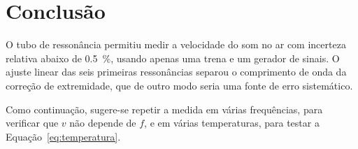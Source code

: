 \chapter{Conclusão}
\label{cap:conclusao}

O tubo de ressonância permitiu medir a velocidade do som no ar com incerteza relativa abaixo de \qty{0.5}{\percent}, usando apenas uma trena e um gerador de sinais. O ajuste linear das seis primeiras ressonâncias separou o comprimento de onda da correção de extremidade, que de outro modo seria uma fonte de erro sistemático.

Como continuação, sugere-se repetir a medida em várias frequências, para verificar que $v$ não depende de $f$, e em várias temperaturas, para testar a Equação~\eqref{eq:temperatura}.
